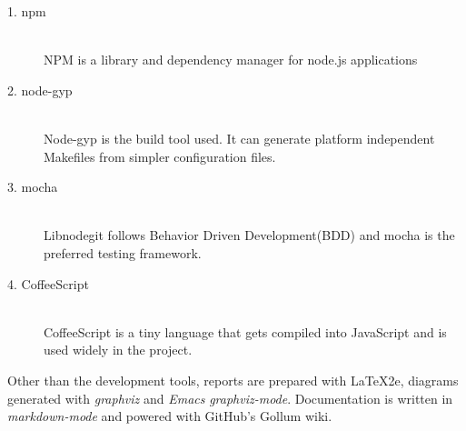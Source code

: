 \begin{description}

\item[1. npm]  \hfill \\
  NPM is a library and dependency manager for node.js applications

\item[2. node-gyp] \hfill \\
  Node-gyp is the build tool used. It can generate platform independent
  Makefiles from simpler configuration files.

\item[3. mocha] \hfill \\
  Libnodegit follows Behavior Driven Development(BDD) and mocha is the
  preferred testing framework.

\item[4. CoffeeScript] \hfill \\
  CoffeeScript is a tiny language that gets compiled into JavaScript and is used
  widely in the project.

\end{description}

Other than the development tools, reports are prepared with \LaTeX2e, diagrams
generated with \textit{graphviz} and \textit{Emacs} \textit{graphviz-mode}.
Documentation is written in \textit{markdown-mode} and powered with GitHub's
Gollum wiki.

